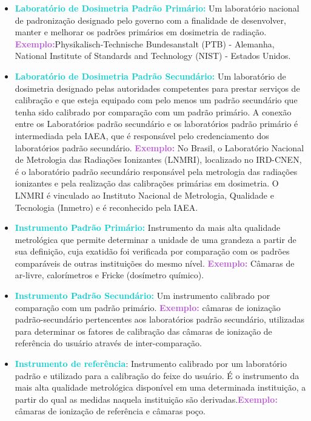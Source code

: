 \documentclass[11pt,a4paper]{article}
\begin{document}
  		\begin{itemize}

			\item \textcolor{DarkTurquoise}{\textbf{Laboratório de Dosimetria Padrão Primário:}} Um laboratório nacional de padronização designado pelo governo com a finalidade de desenvolver, manter e melhorar os padrões primários em dosimetria de radiação. \textcolor{MediumOrchid}{\textbf{Exemplo:}}Physikalisch-Technische Bundesanstalt (PTB) - Alemanha, National Institute of Standards and Technology (NIST) - Estados Unidos. 
			
			\item \textcolor{DarkTurquoise}{\textbf{Laboratório de Dosimetria Padrão Secundário:}} Um laboratório de dosimetria designado pelas autoridades competentes para prestar serviços de calibração e que esteja equipado com pelo menos um padrão secundário que tenha sido calibrado por comparação com um padrão primário. A conexão entre os Laboratórios padrão secundário e os laboratórios padrão primário é intermediada pela IAEA, que é responsável pelo credenciamento dos laboratórios padrão secundário. \textcolor{MediumOrchid}{\textbf{Exemplo:}} No Brasil, o Laboratório Nacional de Metrologia das Radiações Ionizantes (LNMRI), localizado no IRD-CNEN, é o laboratório padrão secundário responsável  pela metrologia das radiações ionizantes e pela realização das calibrações primárias em dosimetria. O LNMRI  é vinculado ao Instituto Nacional de Metrologia, Qualidade e Tecnologia (Inmetro) e é reconhecido pela IAEA.

			\item \textcolor{DarkTurquoise}{\textbf{Instrumento Padrão Primário:}} Instrumento da mais alta qualidade metrológica que permite determinar a unidade de uma grandeza a partir de sua definição, cuja exatidão foi verificada por comparação com os padrões comparáveis de outras instituições do mesmo nível. \textcolor{MediumOrchid}{\textbf{Exemplo:}} Câmaras de ar-livre, calorímetros e Fricke (dosímetro químico).
			
			\item \textcolor{DarkTurquoise}{\textbf{Instrumento Padrão Secundário:}} Um instrumento calibrado por comparação com um padrão primário. \textcolor{MediumOrchid}{\textbf{Exemplo:}} câmaras de ionização padrão-secundário pertencentes aos laboratórios padrão secundário, utilizadas para determinar os fatores de calibração das câmaras de ionização de referência do usuário através de inter-comparação.
			
			\item \textcolor{DarkTurquoise}{\textbf{Instrumento de referência}}: Instrumento calibrado por um laboratório padrão e utilizado para a calibração do feixe do usuário. É o instrumento da mais alta qualidade metrológica disponível em uma determinada instituição, a partir do qual as medidas naquela instituição são derivadas.\textcolor{MediumOrchid}{\textbf{Exemplo:}} câmaras de ionização de referência e câmaras poço.
			

\end{itemize}
\end{document}
